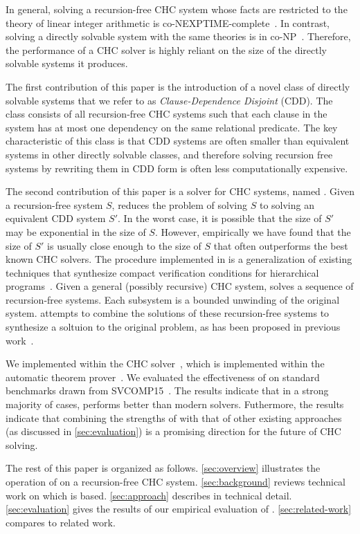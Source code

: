 In general, solving a recursion-free CHC system whose facts are
restricted to the theory of linear integer arithmetic is
co-NEXPTIME-complete~\cite{rummer13b}.
%
In contrast, solving a directly solvable system with the same theories
is in co-NP~\cite{rummer13b}.
%
Therefore, the performance of a CHC solver is highly reliant on the
size of the directly solvable systems it produces.

The first contribution of this paper is the introduction of a novel
class of directly solvable systems that we refer to as
\emph{Clause-Dependence Disjoint} (CDD).
%
The class consists of all recursion-free CHC systems such that each
clause in the system has at most one dependency on the same relational
predicate.
%
The key characteristic of this class is that CDD systems are often
smaller than equivalent systems in other directly solvable classes,
and therefore solving recursion free systems by rewriting them in CDD
form is often less computationally expensive.

The second contribution of this paper is a solver for CHC systems,
named \sys.
%
Given a recursion-free system $S$, \sys reduces the problem
of solving $S$ to solving an equivalent CDD system
$S'$.
%
In the worst case, it is possible that the size of $S'$ may be
exponential in the size of $S$.
%
However, empirically we have found that the size of $S'$ is usually
close enough to the size of $S$ that \sys often outperforms the best
known CHC solvers.
%
The procedure implemented in \sys is a generalization of existing
techniques that synthesize compact verification conditions for
hierarchical programs~\cite{flanagan01,lal-qadeer15}.
%
Given a general (possibly recursive) CHC system, \sys solves a
sequence of recursion-free systems.
%
Each subsystem is a bounded unwinding of the original system. \sys
attempts to combine the solutions of these recursion-free systems to
synthesize a soltuion to the original problem, as has been proposed
in previous work~\cite{rummer13b}.

We implemented \sys within the \duality CHC solver~\cite{bjorner13},
which is implemented within the \zthree automatic theorem
prover~\cite{moura08}.
%
We evaluated the effectiveness of \sys on standard benchmarks drawn
from SVCOMP15~\cite{svcomp15}.
%
The results indicate that in a strong majority of cases,
\sys performs better than modern solvers.
%
Futhermore, the results indicate that combining the strengths of \sys
with that of other existing approaches (as discussed in
\autoref{sec:evaluation}) is a promising direction for the future of
CHC solving.

The rest of this paper is organized as follows.
%
\autoref{sec:overview} illustrates the operation of \sys on a
recursion-free CHC system.
%
\autoref{sec:background} reviews technical work on which \sys is
based.
%
\autoref{sec:approach} describes \sys in technical detail.
%
\autoref{sec:evaluation} gives the results of our empirical evaluation
of \sys.
%
\autoref{sec:related-work} compares \sys to related work.

